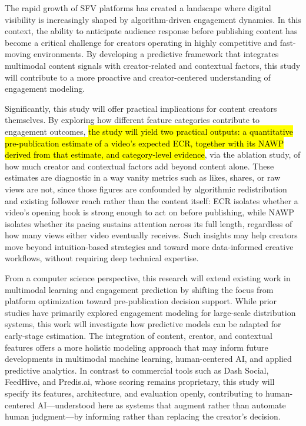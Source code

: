 
The rapid growth of SFV platforms has created a landscape where digital visibility is increasingly shaped by algorithm-driven engagement dynamics. In this context, the ability to anticipate audience response before publishing content has become a critical challenge for creators operating in highly competitive and fast-moving environments. By developing a predictive framework that integrates multimodal content signals with creator-related and contextual factors, this study will contribute to a more proactive and creator-centered understanding of engagement modeling.

Significantly, this study will offer practical implications for content creators themselves. By exploring how different feature categories contribute to engagement outcomes, \hl{the study will yield two practical outputs: a quantitative pre-publication estimate of a video's expected ECR, together with its NAWP derived from that estimate, and category-level evidence}, via the ablation study, of how much creator and contextual factors add beyond content alone. These estimates are diagnostic in a way vanity metrics such as likes, shares, or raw views are not, since those figures are confounded by algorithmic redistribution and existing follower reach rather than the content itself: ECR isolates whether a video's opening hook is strong enough to act on before publishing, while NAWP isolates whether its pacing sustains attention across its full length, regardless of how many views either video eventually receives. Such insights may help creators move beyond intuition-based strategies and toward more data-informed creative workflows, without requiring deep technical expertise.

From a computer science perspective, this research will extend existing work in multimodal learning and engagement prediction by shifting the focus from platform optimization toward pre-publication decision support. While prior studies have primarily explored engagement modeling for large-scale distribution systems, this work will investigate how predictive models can be adapted for early-stage estimation. The integration of content, creator, and contextual features offers a more holistic modeling approach that may inform future developments in multimodal machine learning, human-centered AI, and applied predictive analytics. In contrast to commercial tools such as
Dash Social,
FeedHive,
and Predis.ai, whose scoring remains proprietary, this study will specify its features, architecture, and evaluation openly, contributing to human-centered AI—understood here as systems that augment rather than automate human judgment—by informing rather than replacing the creator's decision.

